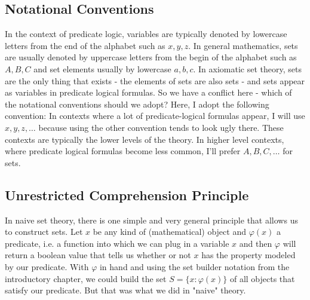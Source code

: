 
\subsection{Notational Conventions}  In the context of predicate logic, variables are typically denoted by lowercase letters from the end of the alphabet such as $x,y,z$. In general mathematics, sets are usually denoted by uppercase letters from the begin of the alphabet such as $A,B,C$ and set elements usually by lowercase $a,b,c$. In axiomatic set theory, sets are the only thing that exists - the elements of sets are also sets - and sets appear as variables in predicate logical formulas. So we have a conflict here - which of the notational conventions should we adopt? Here, I adopt the following convention: In contexts where a lot of predicate-logical formulas appear, I will use $x,y,z, \ldots$ because using the other convention tends to look ugly there. These contexts are typically the lower levels of the theory. In higher level contexts, where predicate logical formulas become less common, I'll prefer  $A,B,C, \ldots$ for sets.

\subsection{Unrestricted Comprehension Principle}
In naive set theory, there is one simple and very general principle that allows us to construct sets. Let $x$ be any kind of (mathematical) object and $\varphi(x)$ a predicate, i.e. a function into which we can plug in a variable $x$ and then $\varphi$ will return a boolean value that tells us whether or not $x$ has the property modeled by our predicate. With $\varphi$ in hand and using the set builder notation from the introductory chapter, we could build the set $S = \{x: \varphi(x)\}$ of all objects that satisfy our predicate. But that was what we did in "naive" theory.


